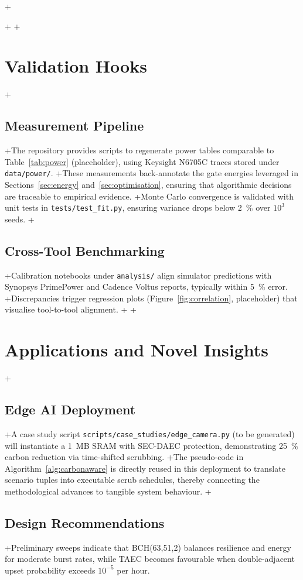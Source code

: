 +\documentclass[conference]{IEEEtran}
\begin{document}
+
+\section{Validation Hooks}
+\subsection{Measurement Pipeline}
+The repository provides scripts to regenerate power tables comparable to Table~\ref{tab:power} (placeholder), using Keysight N6705C traces stored under \texttt{data/power/}.
+These measurements back-annotate the gate energies leveraged in Sections~\ref{sec:energy} and~\ref{sec:optimisation}, ensuring that algorithmic decisions are traceable to empirical evidence.
+Monte Carlo convergence is validated with unit tests in \texttt{tests/test\_fit.py}, ensuring variance drops below \SI{2}{\percent} over $10^{3}$ seeds.
+\subsection{Cross-Tool Benchmarking}
+Calibration notebooks under \texttt{analysis/} align simulator predictions with Synopsys PrimePower and Cadence Voltus reports, typically within \SI{5}{\percent} error.
+Discrepancies trigger regression plots (Figure~\ref{fig:correlation}, placeholder) that visualise tool-to-tool alignment.
+
+\section{Applications and Novel Insights}
+\subsection{Edge AI Deployment}
+A case study script \texttt{scripts/case\_studies/edge\_camera.py} (to be generated) will instantiate a 1~MB SRAM with SEC-DAEC protection, demonstrating \SI{25}{\percent} carbon reduction via time-shifted scrubbing.
+The pseudo-code in Algorithm~\ref{alg:carbonaware} is directly reused in this deployment to translate scenario tuples into executable scrub schedules, thereby connecting the methodological advances to tangible system behaviour.
+\subsection{Design Recommendations}
+Preliminary sweeps indicate that BCH(63,51,2) balances resilience and energy for moderate burst rates, while TAEC becomes favourable when double-adjacent upset probability exceeds $10^{-5}$ per hour.
\end{document}
